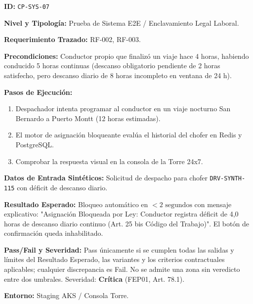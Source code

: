 \par\noindent\textbf{ID:} \texttt{C\allowbreak{}P\allowbreak{}-\allowbreak{}S\allowbreak{}Y\allowbreak{}S\allowbreak{}-\allowbreak{}0\allowbreak{}7\allowbreak{}}\par
\par\noindent\textbf{Nivel y Tipología:} Prueba de Sistema E2E / Enclavamiento Legal Laboral.\par
\par\noindent\textbf{Requerimiento Trazado:} RF-002, RF-003.\par
\par\noindent\textbf{Precondiciones:} Conductor propio que finalizó un viaje hace 4 horas, habiendo conducido 5 horas continuas (descanso obligatorio pendiente de 2 horas satisfecho, pero descanso diario de 8 horas incompleto en ventana de 24 h).\par
\par\noindent\textbf{Pasos de Ejecución:} \par
\begin{enumerate}
\item Despachador intenta programar al conductor en un viaje nocturno San Bernardo a Puerto Montt (12 horas estimadas).
\item El motor de asignación bloqueante evalúa el historial del chofer en Redis y PostgreSQL.
\item Comprobar la respuesta visual en la consola de la Torre 24x7.
\end{enumerate}
\par\noindent\textbf{Datos de Entrada Sintéticos:} Solicitud de despacho para chofer \texttt{D\allowbreak{}R\allowbreak{}V\allowbreak{}-\allowbreak{}S\allowbreak{}Y\allowbreak{}N\allowbreak{}T\allowbreak{}H\allowbreak{}-\allowbreak{}1\allowbreak{}1\allowbreak{}5\allowbreak{}} con déficit de descanso diario.\par
\par\noindent\textbf{Resultado Esperado:} Bloqueo automático en \(< 2\text{ segundos}\) con mensaje explicativo: "Asignación Bloqueada por Ley: Conductor registra déficit de 4,0 horas de descanso diario continuo (Art. 25 bis Código del Trabajo)". El botón de confirmación queda inhabilitado.\par
\par\noindent\textbf{Pass/Fail y Severidad:} Pass únicamente si se cumplen todas las salidas y límites del Resultado Esperado, las variantes y los criterios contractuales aplicables; cualquier discrepancia es Fail. No se admite una zona sin veredicto entre dos umbrales. Severidad: \textbf{Crítica} (FEP01, Art. 78.1).\par
\par\noindent\textbf{Entorno:} Staging AKS / Consola Torre.\par






